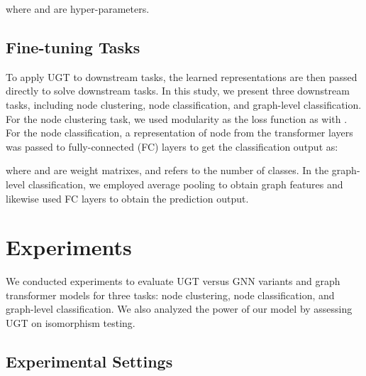 \documentclass[oneside]{article}
\begin{document}
where  and  are hyper-parameters.


\subsection{Fine-tuning Tasks}


To apply UGT to downstream tasks, the learned representations are then passed directly to solve downstream tasks.
In this study, we present three downstream tasks, including node clustering, node classification, and graph-level classification.
For the node clustering task, we used modularity as the loss function as with \cite{DBLP:journals/jmlr/TsitsulinPPM23}.
For the node classification, a representation of node  from the transformer layers was passed to fully-connected (FC) layers to get the classification output  as:

where  and  are weight matrixes, and  refers to the number of classes.
In the graph-level classification, we employed average pooling to obtain graph features and likewise used FC layers to obtain the prediction output.


\section{Experiments}

We conducted experiments to evaluate UGT versus GNN variants and graph transformer models for three tasks: node clustering, node classification, and graph-level classification.
We also analyzed the power of our model by assessing UGT on isomorphism testing.








\subsection{Experimental Settings}
\end{document}
